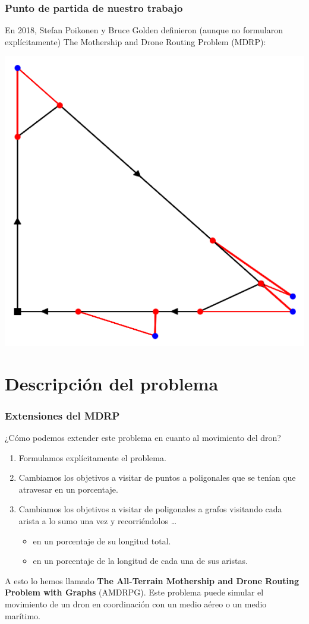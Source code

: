 \documentclass[slidestop,usepdftitle=false, xcolor=table]{beamer}
\begin{document}
	\begin{frame}
		\frametitle{Punto de partida de nuestro trabajo}
		En 2018, Stefan Poikonen y Bruce Golden definieron (aunque no formularon explícitamente) The Mothership and Drone Routing Problem (MDRP):
		\begin{center}
			\includegraphics[width=0.5\linewidth]{poikonen_1}
		\end{center}
	\end{frame}


	\section{Descripción del problema}
	\begin{frame}
		\frametitle{Extensiones del MDRP}
		¿Cómo podemos extender este problema en cuanto al movimiento del dron?
		\begin{enumerate}
			\item Formulamos explícitamente el problema.
			\pause
			\item Cambiamos los objetivos a visitar de puntos a poligonales que se tenían que atravesar en un porcentaje.
			\pause
			\item Cambiamos los objetivos a visitar de poligonales a grafos visitando cada arista a lo sumo una vez y recorriéndolos \ldots
			\begin{itemize}
				\item en un porcentaje de su longitud total.
				\item en un porcentaje de la longitud de cada una de sus aristas.
			\end{itemize}
		\end{enumerate}
		A esto lo hemos llamado \textbf{The All-Terrain Mothership and Drone Routing Problem with Graphs} (AMDRPG). Este problema puede simular el movimiento de un dron en coordinación con un medio aéreo o un medio marítimo.
	\end{frame}
\end{document}
